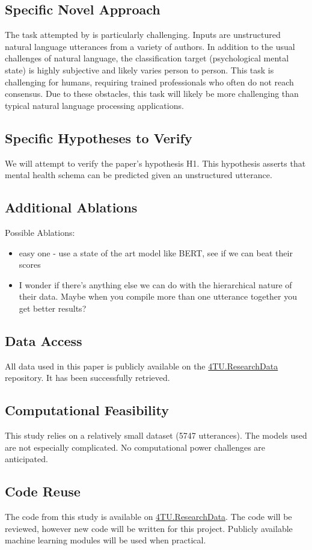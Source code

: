 \documentclass[11pt,a4paper]{article}
\begin{document}
\subsection{Specific Novel Approach}
The task attempted by \cite{burger_2021} is particularly challenging. Inputs are unstructured natural language utterances from a variety of authors. In addition to the usual challenges of natural language, the classification target (psychological mental state) is highly subjective and likely varies person to person. This task is challenging for humans, requiring trained professionals who often do not reach consensus. Due to these obstacles, this task will likely be more challenging than typical natural language processing applications. 

\subsection{Specific Hypotheses to Verify}
We will attempt to verify the paper's hypothesis H1. This hypothesis asserts that mental health schema can be predicted given an unstructured utterance. 

\subsection{Additional Ablations}
Possible Ablations:
\begin{itemize}
  \item easy one - use a state of the art model like BERT, see if we can beat their scores 
  \item I wonder if there's anything else we can do with the hierarchical nature of their data. Maybe when you compile more than one utterance together you get better results?
\end{itemize}

\subsection{Data Access}
All data used in this paper is publicly available on the \href{https://data.4tu.nl/info/en/about-4turesearchdata/organisation}{4TU.ResearchData} repository. It has been successfully retrieved. 

\subsection{Computational Feasibility}
This study relies on a relatively small dataset (5747 utterances). The models used are not especially complicated. No computational power challenges are anticipated. 

\subsection{Code Reuse}
The code from this study is available on \href{https://data.4tu.nl/info/en/about-4turesearchdata/organisation}{4TU.ResearchData}. The code will be reviewed, however new code will be written for this project. Publicly available machine learning modules will be used when practical. 



\end{document}
